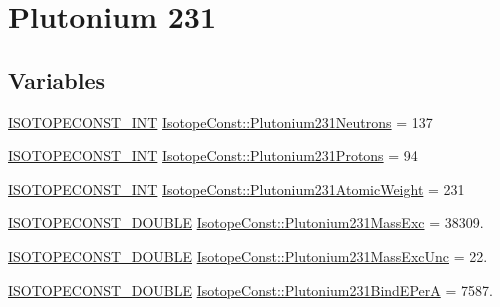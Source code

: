 \hypertarget{group___isotope_const-_plutonium-_pu231}{}\section{Plutonium 231}
\label{group___isotope_const-_plutonium-_pu231}
\subsection*{Variables}
\begin{DoxyCompactItemize}
\item 
\mbox{\hyperlink{group___isotope_const-_macros_ga5f18360b3e99483a35c32d789e62621c}{I\+S\+O\+T\+O\+P\+E\+C\+O\+N\+S\+T\+\_\+\+I\+NT}} \mbox{\hyperlink{group___isotope_const-_plutonium-_pu231_ga4eaefbdcf9e3532ec44fe604f2233e9a}{Isotope\+Const\+::\+Plutonium231\+Neutrons}} = 137
\item 
\mbox{\hyperlink{group___isotope_const-_macros_ga5f18360b3e99483a35c32d789e62621c}{I\+S\+O\+T\+O\+P\+E\+C\+O\+N\+S\+T\+\_\+\+I\+NT}} \mbox{\hyperlink{group___isotope_const-_plutonium-_pu231_gae083b67e4c90cb29080fe78b34e03e22}{Isotope\+Const\+::\+Plutonium231\+Protons}} = 94
\item 
\mbox{\hyperlink{group___isotope_const-_macros_ga5f18360b3e99483a35c32d789e62621c}{I\+S\+O\+T\+O\+P\+E\+C\+O\+N\+S\+T\+\_\+\+I\+NT}} \mbox{\hyperlink{group___isotope_const-_plutonium-_pu231_ga8d9597ed52a12477fb6ccf5cc1d95857}{Isotope\+Const\+::\+Plutonium231\+Atomic\+Weight}} = 231
\item 
\mbox{\hyperlink{group___isotope_const-_macros_ga8f45a7272ce02c0b4c65c44636ed719a}{I\+S\+O\+T\+O\+P\+E\+C\+O\+N\+S\+T\+\_\+\+D\+O\+U\+B\+LE}} \mbox{\hyperlink{group___isotope_const-_plutonium-_pu231_ga4da38563764453c30e85299ac2dbc31a}{Isotope\+Const\+::\+Plutonium231\+Mass\+Exc}} = 38309.
\item 
\mbox{\hyperlink{group___isotope_const-_macros_ga8f45a7272ce02c0b4c65c44636ed719a}{I\+S\+O\+T\+O\+P\+E\+C\+O\+N\+S\+T\+\_\+\+D\+O\+U\+B\+LE}} \mbox{\hyperlink{group___isotope_const-_plutonium-_pu231_gae15fa35d0c3dbf3dba77d19f52a30374}{Isotope\+Const\+::\+Plutonium231\+Mass\+Exc\+Unc}} = 22.
\item 
\mbox{\hyperlink{group___isotope_const-_macros_ga8f45a7272ce02c0b4c65c44636ed719a}{I\+S\+O\+T\+O\+P\+E\+C\+O\+N\+S\+T\+\_\+\+D\+O\+U\+B\+LE}} \mbox{\hyperlink{group___isotope_const-_plutonium-_pu231_gac8b88f1f58b9df90febfa7d249a047e2}{Isotope\+Const\+::\+Plutonium231\+Bind\+E\+PerA}} = 7587.
\item 

\end{DoxyCompactItemize}
